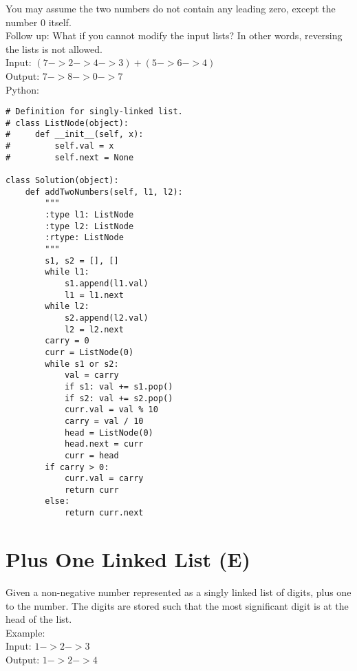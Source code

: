 You may assume the two numbers do not contain any leading zero, except the number 0 itself.\\

Follow up:
What if you cannot modify the input lists? In other words, reversing the lists is not allowed. \\

Input: $(7 -> 2 -> 4 -> 3) + (5 -> 6 -> 4)$ \\
Output: $7 -> 8 -> 0 -> 7$\\

Python:
\lstset{language=python}
\begin{lstlisting}
# Definition for singly-linked list.
# class ListNode(object):
#     def __init__(self, x):
#         self.val = x
#         self.next = None

class Solution(object):
    def addTwoNumbers(self, l1, l2):
        """
        :type l1: ListNode
        :type l2: ListNode
        :rtype: ListNode
        """
        s1, s2 = [], []
        while l1:
            s1.append(l1.val)
            l1 = l1.next
        while l2:
            s2.append(l2.val)
            l2 = l2.next
        carry = 0
        curr = ListNode(0)
        while s1 or s2:
            val = carry
            if s1: val += s1.pop()
            if s2: val += s2.pop()
            curr.val = val % 10
            carry = val / 10
            head = ListNode(0)
            head.next = curr
            curr = head
        if carry > 0:
            curr.val = carry
            return curr
        else:
            return curr.next
\end{lstlisting}

\section{Plus One Linked List (E)}
Given a non-negative number represented as a singly linked list of digits, plus one to the number. The digits are stored such that the most significant digit is at the head of the list.\\

Example:\\
Input: $1->2->3$\\
Output: $1->2->4$\\

